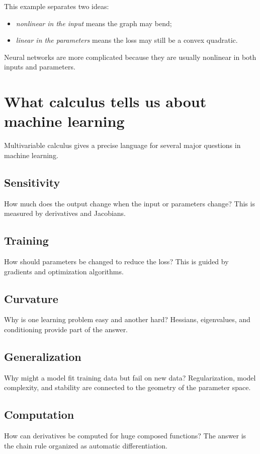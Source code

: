 \documentclass[11pt,oneside]{book}
\begin{document}
This example separates two ideas:
\begin{itemize}
  \item \emph{nonlinear in the input} means the graph may bend;
  \item \emph{linear in the parameters} means the loss may still be a convex quadratic.
\end{itemize}
Neural networks are more complicated because they are usually nonlinear in both inputs and parameters.

\section{What calculus tells us about machine learning}

Multivariable calculus gives a precise language for several major questions in machine learning.

\subsection*{Sensitivity}
How much does the output change when the input or parameters change? This is measured by derivatives and Jacobians.

\subsection*{Training}
How should parameters be changed to reduce the loss? This is guided by gradients and optimization algorithms.

\subsection*{Curvature}
Why is one learning problem easy and another hard? Hessians, eigenvalues, and conditioning provide part of the answer.

\subsection*{Generalization}
Why might a model fit training data but fail on new data? Regularization, model complexity, and stability are connected to the geometry of the parameter space.

\subsection*{Computation}
How can derivatives be computed for huge composed functions? The answer is the chain rule organized as automatic differentiation.
\end{document}
